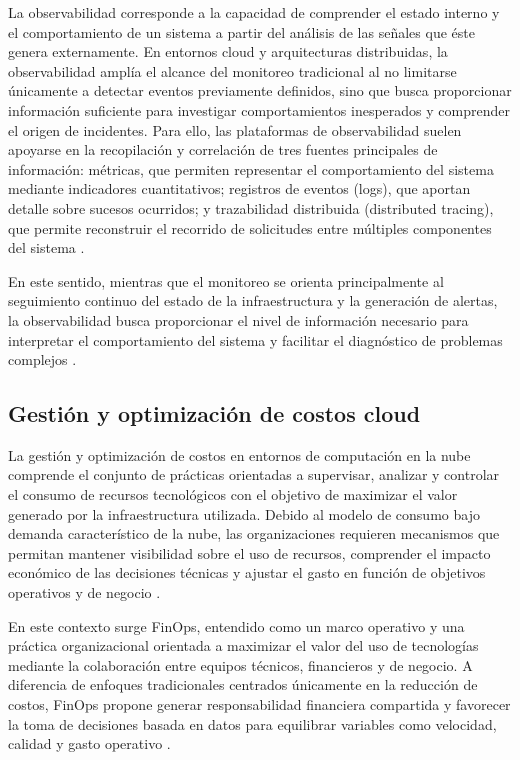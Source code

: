 La observabilidad corresponde a la capacidad de comprender el estado interno y el comportamiento de un sistema a partir del análisis de las señales que éste genera externamente. En entornos cloud y arquitecturas distribuidas, la observabilidad amplía el alcance del monitoreo tradicional al no limitarse únicamente a detectar eventos previamente definidos, sino que busca proporcionar información suficiente para investigar comportamientos inesperados y comprender el origen de incidentes. Para ello, las plataformas de observabilidad suelen apoyarse en la recopilación y correlación de tres fuentes principales de información: métricas, que permiten representar el comportamiento del sistema mediante indicadores cuantitativos; registros de eventos (logs), que aportan detalle sobre sucesos ocurridos; y trazabilidad distribuida (distributed tracing), que permite reconstruir el recorrido de solicitudes entre múltiples componentes del sistema \parencite{Kratzke2022}.

En este sentido, mientras que el monitoreo se orienta principalmente al seguimiento continuo del estado de la infraestructura y la generación de alertas, la observabilidad busca proporcionar el nivel de información necesario para interpretar el comportamiento del sistema y facilitar el diagnóstico de problemas complejos \parencite{Kratzke2022}.

\subsection{Gestión y optimización de costos cloud}

La gestión y optimización de costos en entornos de computación en la nube comprende el conjunto de prácticas orientadas a supervisar, analizar y controlar el consumo de recursos tecnológicos con el objetivo de maximizar el valor generado por la infraestructura utilizada. Debido al modelo de consumo bajo demanda característico de la nube, las organizaciones requieren mecanismos que permitan mantener visibilidad sobre el uso de recursos, comprender el impacto económico de las decisiones técnicas y ajustar el gasto en función de objetivos operativos y de negocio \parencite{FinOps2026}.

En este contexto surge FinOps, entendido como un marco operativo y una práctica organizacional orientada a maximizar el valor del uso de tecnologías mediante la colaboración entre equipos técnicos, financieros y de negocio. A diferencia de enfoques tradicionales centrados únicamente en la reducción de costos, FinOps propone generar responsabilidad financiera compartida y favorecer la toma de decisiones basada en datos para equilibrar variables como velocidad, calidad y gasto operativo \parencite{FinOps2026}.

